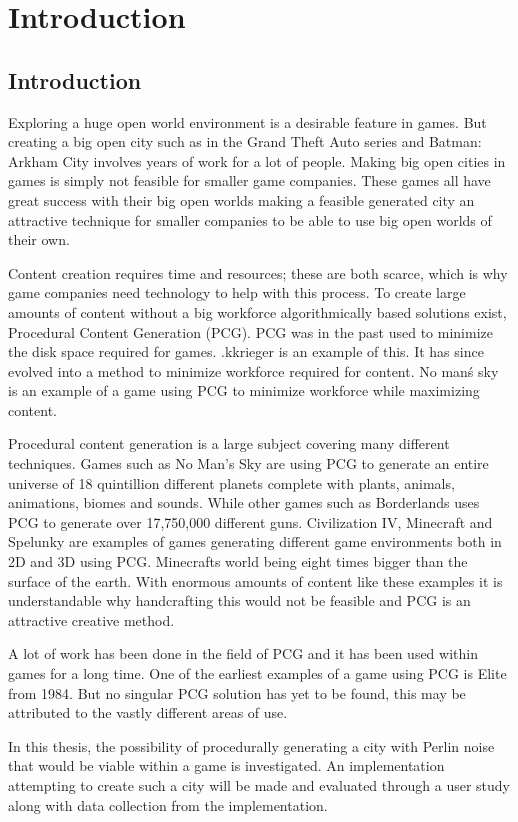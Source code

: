 \section{Introduction}
	\subsection{Introduction}
	Exploring a huge open world environment is a desirable feature in games. But creating a big open city such as in the Grand Theft Auto series and Batman: Arkham City involves years of work for a lot of people. Making big open cities in games is simply not feasible for smaller game companies. These games all have great success with their big open worlds making a feasible generated city an attractive technique for smaller companies to be able to use big open worlds of their own.
	\par
	Content creation requires time and resources; these are both scarce, which is why game companies need technology to help with this process.
	To create large amounts of content without a big workforce algorithmically based solutions exist, Procedural Content Generation (PCG). PCG was in the past used to minimize the disk space required for games. .kkrieger is an  example of this. It has since evolved into a method to minimize workforce required for content. No man\'s sky is an example of a game using PCG to minimize workforce while maximizing content.
	\par
	Procedural content generation is a large subject covering many different techniques. Games such as No Man's Sky\cite{NoMansSky} are using PCG to generate an entire universe of 18 quintillion\cite{NoMansSkyplanets} different planets complete with plants, animals, animations, biomes and sounds. While other games such as Borderlands\cite{Borderlands} uses PCG to generate over 17,750,000 different guns\cite{BorderlandsWeapons}. Civilization IV\cite{CivilizationCompany}, Minecraft\cite{Minecraft} and Spelunky\cite{Spelunky} are examples of games generating different game environments both in 2D and 3D using PCG. Minecrafts world being eight times bigger than the surface of the earth\cite{MinecraftSize}. With enormous amounts of content like these examples it is understandable why handcrafting this would not be feasible and PCG is an attractive creative method.
	\par
	A lot of work has been done in the field of PCG and it has been used within games for a long time. One of the earliest examples of a game using PCG is Elite\cite{Elite} from 1984. But no singular PCG solution has yet to be found, this may be attributed to the vastly different areas of use.
	\par
	In this thesis, the possibility of procedurally generating a city with Perlin noise that would be viable within a game is investigated. An implementation attempting to create such a city will be made and evaluated through a user study along with data collection from the implementation.
	

